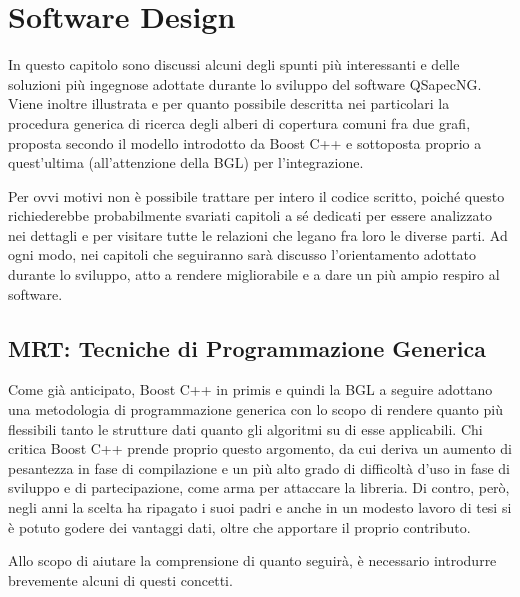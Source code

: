 \chapter{Software Design}

In questo capitolo sono discussi alcuni degli spunti più interessanti e delle soluzioni più ingegnose adottate durante lo sviluppo del software QSapecNG. Viene inoltre illustrata e per quanto possibile descritta nei particolari la procedura generica di ricerca degli alberi di copertura comuni fra due grafi, proposta secondo il modello introdotto da Boost C++ e sottoposta proprio a quest'ultima (all'attenzione della BGL) per l'integrazione.

Per ovvi motivi non è possibile trattare per intero il codice scritto, poiché questo richiederebbe probabilmente svariati capitoli a sé dedicati per essere analizzato nei dettagli e per visitare tutte le relazioni che legano fra loro le diverse parti. Ad ogni modo, nei capitoli che seguiranno sarà discusso l'orientamento adottato durante lo sviluppo, atto a rendere migliorabile e a dare un più ampio respiro al software.


\section{MRT: Tecniche di Programmazione Generica}

Come già anticipato, Boost C++ in primis e quindi la BGL a seguire adottano una metodologia di programmazione generica con lo scopo di rendere quanto più flessibili tanto le strutture dati quanto gli algoritmi su di esse applicabili. Chi critica Boost C++ prende proprio questo argomento, da cui deriva un aumento di pesantezza in fase di compilazione e un più alto grado di difficoltà d'uso in fase di sviluppo e di partecipazione, come arma per attaccare la libreria. Di contro, però, negli anni la scelta ha ripagato i suoi padri e anche in un modesto lavoro di tesi si è potuto godere dei vantaggi dati, oltre che apportare il proprio contributo.

Allo scopo di aiutare la comprensione di quanto seguirà, è necessario introdurre brevemente alcuni di questi concetti.


